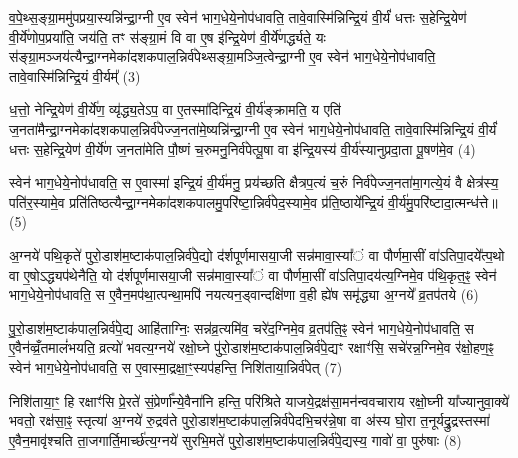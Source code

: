 व॒पे॒थ्स॒ङ्ग्रा॒ममु॑पप्रया॒स्यन्नि॑न्द्रा॒ग्नी ए॒व स्वेन॑ भाग॒धेये॒नोप॑धावति॒ तावे॒वास्मि॑न्निन्द्रि॒यं वी॒र्यं॑ धत्तः स॒हेन्द्रि॒येण॑ वी॒र्ये॑णोप॒प्रया॑ति॒ जय॑ति॒ तꣳ स॑ङ्ग्रा॒मं वि वा ए॒ष इ॑न्द्रि॒येण॑ वी॒र्ये॑णर्द्ध्यते॒ यः स॑ङ्ग्रा॒मञ्जय॑त्यैन्द्रा॒ग्नमेका॑दश\-कपाल॒न्निर्व॑पेथ्सङ्ग्रा॒मञ्जि॒त्वेन्द्रा॒ग्नी ए॒व स्वेन॑ भाग॒धेये॒नोप॑धावति॒ तावे॒वास्मि॑न्निन्द्रि॒यं वी॒र्यम्᳚ (3)

ध॒त्तो॒ नेन्द्रि॒येण॑ वी॒र्ये॑ण॒ व्यृ॑द्ध्य॒ते\-ऽप॒ वा ए॒तस्मा॑दिन्द्रि॒यं वी॒र्य॑ङ्क्रामति॒ य एति॑ ज॒नता॑मैन्द्रा॒ग्नमेका॑दशकपाल॒न्निर्व॑पेज्ज॒नता॑मे॒ष्यन्नि॑न्द्रा॒ग्नी ए॒व स्वेन॑ भाग॒धेये॒नोप॑धावति॒ तावे॒वास्मि॑न्निन्द्रि॒यं वी॒र्यं॑ धत्तः स॒हेन्द्रि॒येण॑ वी॒र्ये॑ण ज॒नता॑मेति पौ॒ष्णं च॒रुमनु॒निर्व॑पेत्पू॒षा वा इ॑न्द्रि॒यस्य॑ वी॒र्य॑स्यानुप्रदा॒ता पू॒षण॑मे॒व (4)

स्वेन॑ भाग॒धेये॒नोप॑धावति॒ स ए॒वास्मा॑ इन्द्रि॒यं वी॒र्य॑मनु॒ प्रय॑च्छति क्षैत्रप॒त्यं च॒रुं निर्व॑पेज्ज॒नता॑मा॒गत्ये॒यं वै क्षेत्र॑स्य॒ पति॑र॒स्यामे॒व प्रति॑तिष्ठत्यैन्द्रा॒ग्नमेका॑दशकपालमु॒परि॑ष्टा॒न्निर्व॑पेद॒स्यामे॒व प्र॑ति॒ष्ठाये᳚न्द्रि॒यं वी॒र्य॑मु॒परि॑ष्टादा॒त्मन्ध॑त्ते॥ (5)

{\anuvakamend[{प्र॒जाका॑म इन्द्रा॒ग्नी उ॑पप्र॒यात्यै᳚न्द्रा॒ग्नमेका॑दशकपाल॒न्निर्वी॒र्यं॑ पू॒षण॑मे॒वैका॒न्नच॑त्वारि॒ꣳ॒शच्च॑॥1।}]}

अ॒ग्नये॑ पथि॒कृते॑ पुरो॒डाश॑म॒ष्टाक॑पाल॒न्निर्व॑पे॒द्यो द॑र्\mbox{}शपूर्णमासया॒जी सन्न॑मावा॒स्या᳚ं वा पौर्णमा॒सीं वा॑\-ऽतिपा॒दये᳚त्प॒थो वा ए॒षो\-ऽद्ध्यप॑थेनैति॒ यो द॑र्\mbox{}शपूर्णमासया॒जी सन्न॑मावा॒स्या᳚ं वा पौर्णमा॒सीं वा॑\-ऽतिपा॒दय॑त्य॒ग्निमे॒व प॑थि॒कृत॒ꣴ॒ स्वेन॑ भाग॒धेये॒नोप॑धावति॒ स ए॒वैन॒मप॑था॒त्पन्था॒मपि॑ नयत्यन॒ड्वान्दक्षि॑णा व॒ही ह्ये॑ष समृ॑द्ध्या अ॒ग्नये᳚ व्र॒तप॑तये (6)

पु॒रो॒डाश॑म॒ष्टाक॑पाल॒न्निर्व॑पे॒द्य आहि॑ताग्निः॒ सन्न॑व्र॒त्यमि॑व॒ चरे॑द॒ग्निमे॒व व्र॒तप॑ति॒ꣴ॒ स्वेन॑ भाग॒धेये॒नोप॑धावति॒ स ए॒वैन॑व्व्रँ॒तमालं॑भयति॒ व्रत्यो॑ भवत्य॒ग्नये॑ रक्षो॒घ्ने पु॑रो॒डाश॑म॒ष्टाक॑पाल॒न्निर्व॑पे॒द्यꣳ रक्षाꣳ॑सि॒ सचे॑रन्न॒ग्निमे॒व र॑क्षो॒हण॒ꣴ॒ स्वेन॑ भाग॒धेये॒नोप॑धावति॒ स ए॒वास्मा॒द्रक्षा॒ꣳ॒स्यप॑हन्ति॒ निशि॑ताया॒न्निर्व॑पेत् (7)

निशि॑ताया॒ꣳ॒ हि रक्षाꣳ॑सि प्रे॒रते॑ सं॒प्रेर्णा᳚न्ये॒वैना॑नि हन्ति॒ परि॑श्रिते याजये॒द्रक्ष॑सा॒मन॑न्ववचाराय रक्षो॒घ्नी या᳚ज्यानुवा॒क्ये॑ भवतो॒ रक्ष॑सा॒ꣴ॒ स्तृत्या॑ अ॒ग्नये॑ रु॒द्रव॑ते पुरो॒डाश॑म॒ष्टाक॑पाल॒न्निर्व॑पेदभि॒चर॑न्ने॒षा वा अ॑स्य घो॒रा त॒नूर्यद्रु॒द्रस्तस्मा॑ ए॒वैन॒मावृ॑श्चति ता॒जगार्ति॒मार्च्छ॑त्य॒ग्नये॑ सुरभि॒मते॑ पुरो॒डाश॑म॒ष्टाक॑पाल॒न्निर्व॑पे॒द्यस्य॒ गावो॑ वा॒ पुरु॑षाः (8)

